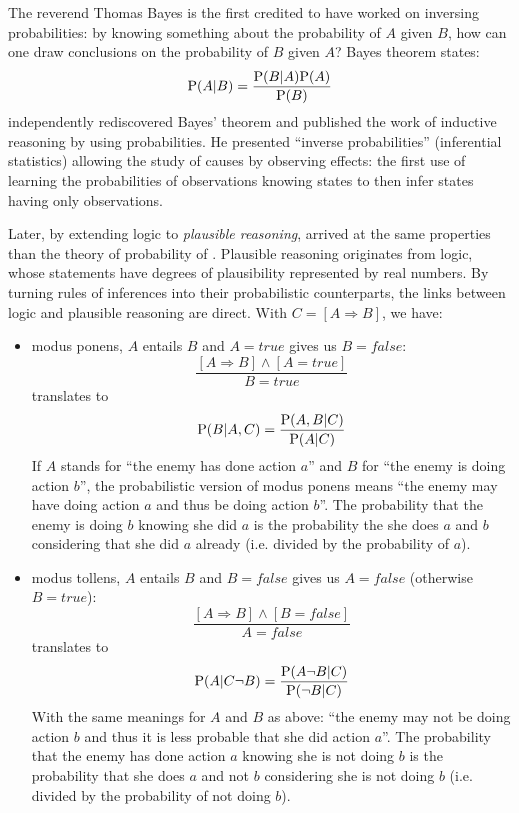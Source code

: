 The reverend Thomas Bayes is the first credited to have worked on inversing probabilities: by knowing something about the probability of $A$ given $B$, how can one draw conclusions on the probability of $B$ given $A$? Bayes theorem states: $$\mathrm{P}(A|B) = \frac{\mathrm{P}(B|A)\mathrm{P}(A)}{\mathrm{P}(B)}$$
\cite{Laplace} independently rediscovered Bayes' theorem and published the work of inductive reasoning by using probabilities. He presented ``inverse probabilities'' (inferential statistics) allowing the study of causes by observing effects: the first use of learning the probabilities of observations knowing states to then infer states having only observations.

Later, by extending logic to \textit{plausible reasoning}, \cite{Jaynes} arrived at the same properties than the theory of probability of \cite{Kolmogorov33}. Plausible reasoning originates from logic, whose statements have degrees of plausibility represented by real numbers. %
By turning rules of inferences into their probabilistic counterparts, the links between logic and plausible reasoning are direct. With $C=[A\Rightarrow B]$, we have:
\begin{itemize}
    \item modus ponens, $A$ entails $B$ and $A=true$ gives us $B=false$: $$\frac{[A\Rightarrow B] \wedge [A=true]}{B=true}$$ translates to $$\mathrm{P}(B|A,C)=\frac{\mathrm{P}(A,B|C)}{\mathrm{P}(A|C)}$$
    If $A$ stands for ``the enemy has done action $a$'' and $B$ for ``the enemy is doing action $b$'', the probabilistic version of modus ponens means ``the enemy may have doing action $a$ and thus be doing action $b$''. The probability that the enemy is doing $b$ knowing she did $a$ is the probability the she does $a$ and $b$ considering that she did $a$ already (i.e. divided by the probability of $a$).
    \item modus tollens, $A$ entails $B$ and $B=false$ gives us $A=false$ (otherwise $B=true$): $$\frac{[A\Rightarrow B] \wedge [B=false]}{A=false}$$ translates to $$\mathrm{P}(A|C\neg B)=\frac{\mathrm{P}(A \neg B|C)}{\mathrm{P}(\neg B|C)}$$
    With the same meanings for $A$ and $B$ as above: ``the enemy may not be doing action $b$ and thus it is less probable that she did action $a$''. The probability that the enemy has done action $a$ knowing she is not doing $b$ is the probability that she does $a$ and not $b$ considering she is not doing $b$ (i.e. divided by the probability of not doing $b$).
    
\end{itemize}
